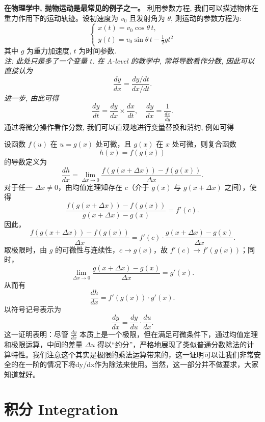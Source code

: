 \documentclass[8pt,a4paper,twoside]{tau-class/tau}
\begin{document}
\begin{tcolorbox}[enhanced, breakable, boxsep=1pt, colframe=blue!50!black, colback=white, fonttitle=\footnotesize, fontupper=\footnotesize, title style={align=center}, title=抛物运动(物理学中的参数方程)]
\noindent\textbf{在物理学中, 抛物运动是最常见的例子之一。} 利用参数方程, 我们可以描述物体在重力作用下的运动轨迹。设初速度为 \(v_0\) 且发射角为 \(\theta\), 则运动的参数方程为:
\[
  \begin{cases}
    x(t) = v_0\cos\theta\,t, \\[6pt]
    y(t) = v_0\sin\theta\,t − \frac{1}{2}g t^2
  \end{cases}
\]
其中 \(g\) 为重力加速度, \(t\) 为时间参数.\\[4pt]
\textit{注: 此处只是多了一个变量 \(t\). 在 A-level 的教学中, 常将导数看作分数, 因此可以直接认为}
\[
\frac{dy}{dx} = \frac{dy/dt}{dx/dt}.
\]
\textit{进一步, 由此可得}
\[
\frac{dy}{dt} = \frac{dy}{dx} \times \frac{dx}{dt},\quad \frac{dy}{dx} = \frac{1}{\frac{dx}{dy}}.
\]
通过将微分操作看作分数, 我们可以直观地进行变量替换和消约, 例如可得
\end{tcolorbox}
\begin{tcolorbox}[enhanced, breakable, boxsep=1pt, colframe=white!50!black, colback=white, fonttitle=\footnotesize, fontupper=\footnotesize, title=\textbf{证明导数的“分数”性质}]
设函数 \( f(u) \) 在 \( u = g(x) \) 处可微，且 \( g(x) \) 在 \( x \) 处可微，则复合函数
\[
h(x) = f(g(x))
\]
的导数定义为
\[
\frac{dh}{dx} = \lim_{\Delta x \to 0} \frac{f(g(x+\Delta x))−f(g(x))}{\Delta x}.
\]
对于任一 \( \Delta x\neq 0 \)，由均值定理知存在 \( c \)（介于 \( g(x) \) 与 \( g(x+\Delta x) \) 之间），使得
\[
\frac{f(g(x+\Delta x))−f(g(x))}{g(x+\Delta x)−g(x)} = f'(c).
\]
因此，
\[
\frac{f(g(x+\Delta x))−f(g(x))}{\Delta x} = f'(c)\cdot \frac{g(x+\Delta x)−g(x)}{\Delta x}.
\]
取极限时，由 \( g \) 的可微性与连续性，\( c\to g(x) \)，故 \( f'(c) \to f'(g(x)) \)；同时，
\[
\lim_{\Delta x\to 0}\frac{g(x+\Delta x)−g(x)}{\Delta x} = g'(x).
\]
从而有
\[
\frac{dh}{dx} = f'(g(x))\cdot g'(x).
\]
以符号记号表示为
\[
\frac{dy}{dx}=\frac{dy}{du}\cdot\frac{du}{dx}.
\]
这一证明表明：尽管 \( \frac{dy}{dx} \) 本质上是一个极限，但在满足可微条件下，通过均值定理和极限运算，中间的差量 \( \Delta u \) 得以“约分”，严格地展现了类似普通分数除法的计算特性。我们注意这个其实是极限的乘法运算带来的，这一证明可以让我们非常安全的在一阶的情况下将dy/dx作为除法来使用。当然，这一部分并不做要求，大家知道就好。
\end{tcolorbox}
\newpage
\section{积分 Integration}
\end{document}
